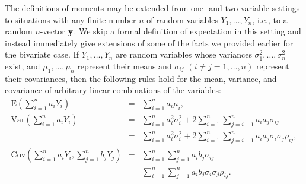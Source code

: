 The definitions of moments may be extended from one- and two-variable settings to situations with any finite number $n$ of random variables $Y_1,\ldots,Y_n$, i.e., to a random $n$-vector ${\bf y}$.  We skip a formal definition of expectation in this setting and instead immediately give extensions of some of the facts we provided earlier for the bivariate case.  If $Y_1,\ldots,Y_n$ are random variables whose variances $\sigma_1^2,\ldots,\sigma_n^2$ exist, and $\mu_1,\ldots,\mu_n$ represent their means and $\sigma_{ij}$ $(i\neq j=1,\ldots,n)$ represent their covariances, then the following rules hold for the mean, variance, and covariance of arbitrary linear combinations of the variables:
\begin{eqnarray}
\mbox{E}\left(\sum_{i=1}^na_iY_i\right) & = & \sum_{i=1}^na_i\mu_i, \label{vectormoment1} \\
\mbox{Var}\left(\sum_{i=1}^na_iY_i\right) & = & \sum_{i=1}^na_i^2\sigma_i^2+2\sum_{i=1}^n\sum_{j=i+1}^na_ia_j\sigma_{ij} \label{vectormoment2} \\
& = & \sum_{i=1}^na_i^2\sigma_i^2+2\sum_{i=1}^n\sum_{j=i+1}^na_ia_j\sigma_{i}\sigma_j\rho_{ij}, \label{vectormoment3} \\
\mbox{Cov}\left(\sum_{i=1}^na_iY_i,\sum_{j=1}^nb_jY_j\right) & = & \sum_{i=1}^n\sum_{j=1}^na_ib_j\sigma_{ij} \label{vectormoment4} \\
& = & \sum_{i=1}^n\sum_{j=1}^na_ib_j\sigma_i\sigma_j\rho_{ij}. \label{vectormoment5}
\end{eqnarray}

